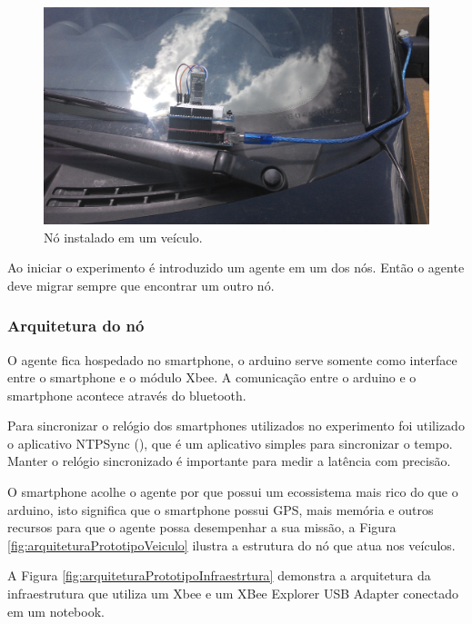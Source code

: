 \begin{figure}[htbp]
	\centering
	\includegraphics[scale=0.06]{metodologia/figuras/noInstaladoVeiculo.jpg}
	\caption{Nó instalado em um veículo.}
	\label{fig:noInstaladoVeiculo}
\end{figure}

Ao iniciar o experimento é introduzido um agente em um dos nós. Então o agente deve migrar sempre que encontrar um outro nó.

\subsubsection{Arquitetura do nó}

O agente fica hospedado no smartphone, o arduino serve somente como interface entre o smartphone e o módulo Xbee. A comunicação entre o arduino e o smartphone acontece através do bluetooth. 

Para sincronizar o relógio dos smartphones utilizados no experimento foi utilizado o aplicativo NTPSync (\cite{Ntpsync:2015}), que é um aplicativo simples para sincronizar o tempo. Manter o relógio sincronizado é importante para medir a latência com precisão. 

O smartphone acolhe o agente por que possui um ecossistema mais rico do que o arduino, isto significa que o smartphone possui GPS, mais memória e outros recursos para que o agente possa desempenhar a sua missão, a Figura \ref{fig:arquiteturaPrototipoVeiculo} ilustra a estrutura do nó que atua nos veículos. 

A Figura \ref{fig:arquiteturaPrototipoInfraestrtura} demonstra a arquitetura da infraestrutura que utiliza um Xbee e um XBee Explorer USB Adapter conectado em um notebook.

